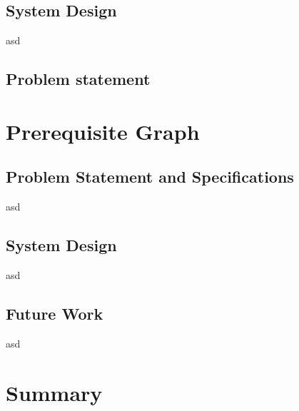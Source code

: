 \documentclass{beamer}
\begin{document}
\subsection{System Design}

\begin{frame}
	asd
\end{frame}

\subsection{Problem statement}

\section{Prerequisite Graph}

\subsection{Problem Statement and Specifications}

\begin{frame}
	asd
\end{frame}

\subsection{System Design}

\begin{frame}
	asd
\end{frame}

\subsection{Future Work}

\begin{frame}
	asd
\end{frame}

\section*{Summary}
\end{document}
